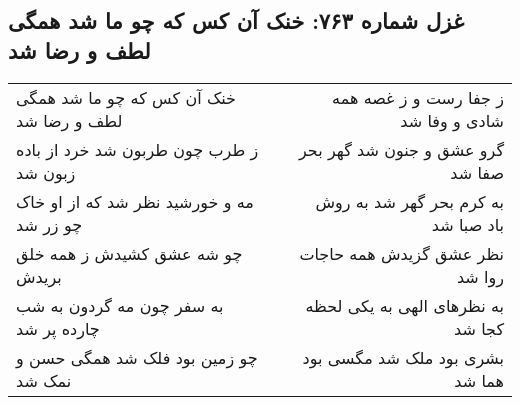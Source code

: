 \begin{center}
\section*{غزل شماره ۷۶۳: خنک آن کس که چو ما شد همگی لطف و رضا شد}
\label{sec:0763}
\begin{longtable}{l p{0.5cm} r}
خنک آن کس که چو ما شد همگی لطف و رضا شد
&&
ز جفا رست و ز غصه همه شادی و وفا شد
\\
ز طرب چون طربون شد خرد از باده زبون شد
&&
گرو عشق و جنون شد گهر بحر صفا شد
\\
مه و خورشید نظر شد که از او خاک چو زر شد
&&
به کرم بحر گهر شد به روش باد صبا شد
\\
چو شه عشق کشیدش ز همه خلق بریدش
&&
نظر عشق گزیدش همه حاجات روا شد
\\
به سفر چون مه گردون به شب چارده پر شد
&&
به نظرهای الهی به یکی لحظه کجا شد
\\
چو زمین بود فلک شد همگی حسن و نمک شد
&&
بشری بود ملک شد مگسی بود هما شد
\\
\end{longtable}
\end{center}
